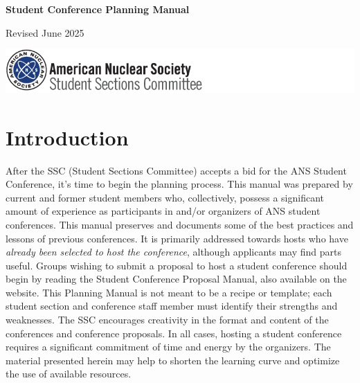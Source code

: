\documentclass[12pt]{article}
\begin{document}
\begin{titlepage}
\vspace*{2cm}
\centering
{\Huge\bfseries Student Conference Planning Manual\par}

\vspace{2cm}
\rm{\Large Revised June 2025\par }

\vfill
\includegraphics[scale=0.75]{SSClogo.png}
\end{titlepage}

{\hypersetup{linkcolor=black}
\tableofcontents
}

\clearpage

\section{Introduction}

After the SSC (Student Sections Committee) accepts a bid for the ANS Student Conference, it's time to begin the planning process.
This manual was prepared by current and former student members who, collectively, possess a significant amount of experience as participants in and/or organizers of ANS student conferences.
This manual preserves and documents some of the best practices and lessons of previous conferences.
It is primarily addressed towards hosts who have \emph{already been selected to host the conference}, although applicants may find parts useful.
Groups wishing to submit a proposal to host a student conference should begin by reading the Student Conference Proposal Manual, also available on the website.
This Planning Manual is not meant to be a recipe or template; each student section and conference staff member must identify their strengths and weaknesses.
The SSC encourages creativity in the format and content of the conferences and conference proposals.
In all cases, hosting a student conference requires a significant commitment of time and energy by the organizers.
The material presented herein may help to shorten the learning curve and optimize the use of available resources.
\end{document}
